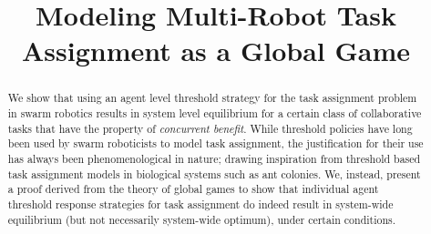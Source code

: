 \documentclass[conference]{ieeeconf}
\begin{document}
\title{Modeling Multi-Robot Task Assignment as a Global Game}

\author{
\and
{}
}

\maketitle

\begin{abstract}
We show that using an agent level threshold strategy for the task assignment problem in swarm robotics results in system level equilibrium for a certain class of collaborative tasks that have the property of \emph{concurrent benefit}. While threshold policies have long been used by swarm roboticists to model task assignment, the justification for their use has always been phenomenological in nature; drawing inspiration from threshold based task assignment models in biological systems such as ant colonies. We, instead, present a proof derived from the theory of global games to show that individual agent threshold response strategies for task assignment do indeed result in system-wide equilibrium (but not necessarily system-wide optimum), under certain conditions.
\end{abstract}

\IEEEpeerreviewmaketitle

\end{document}
